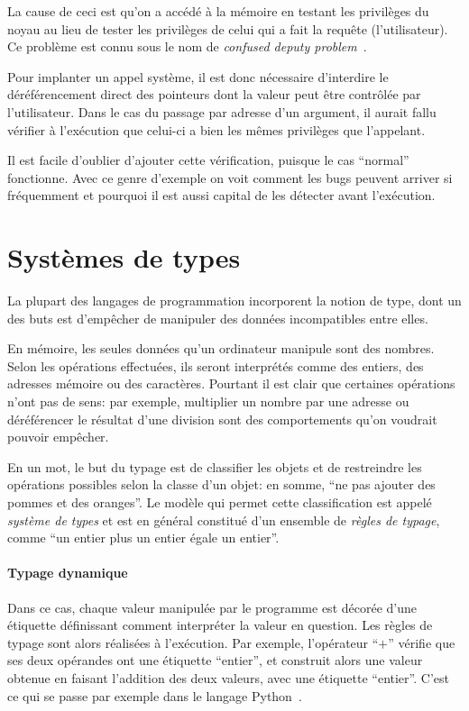 La cause de ceci est qu'on a accédé à la mémoire en testant les privilèges du
noyau au lieu de tester les privilèges de celui qui a fait la requête
(l'utilisateur). Ce problème est connu sous le nom de \emph{confused deputy
problem}~\cite{hardy88confused}.

Pour implanter un appel système, il est donc nécessaire d'interdire le
déréférencement direct des pointeurs dont la valeur peut être contrôlée par
l'utilisateur. Dans le cas du passage par adresse d'un argument, il aurait fallu
vérifier à l'exécution que celui-ci a bien les mêmes privilèges que l'appelant.

Il est facile d'oublier d'ajouter cette vérification, puisque le cas
\enquote{normal} fonctionne. Avec ce genre d'exemple on voit comment les bugs
peuvent arriver si fréquemment et pourquoi il est aussi capital de les détecter
avant l'exécution.

\section{Systèmes de types}
\label{sec:types-intro}

La plupart des langages de programmation incorporent la notion de type, dont un
des buts est d'empêcher de manipuler des données incompatibles entre elles.

En mémoire, les seules données qu'un ordinateur manipule sont des nombres. Selon
les opérations effectuées, ils seront interprétés comme des entiers, des
adresses mémoire ou des caractères. Pourtant il est clair que certaines
opérations n'ont pas de sens: par exemple, multiplier un nombre par une adresse
ou déréférencer le résultat d'une division sont des comportements qu'on voudrait
pouvoir empêcher.

En un mot, le but du typage est de classifier les objets et de restreindre les
opérations possibles selon la classe d'un objet: en somme, \enquote{ne pas
ajouter des pommes et des oranges}. Le modèle qui permet cette classification
est appelé \emph{système de types} et est en général constitué d'un ensemble de
\emph{règles de typage}, comme \enquote{un entier plus un entier égale un
entier}.

\paragraph{Typage dynamique}

Dans ce cas, chaque valeur manipulée par le programme est décorée d'une
étiquette définissant comment interpréter la valeur en question. Les règles de
typage sont alors réalisées à l'exécution. Par exemple, l'opérateur
\enquote{$+$} vérifie que ses deux opérandes ont une étiquette \enquote{entier},
et construit alors une valeur obtenue en faisant l'addition des deux valeurs,
avec une étiquette \enquote{entier}. C'est ce qui se passe par exemple dans le
langage Python~.

